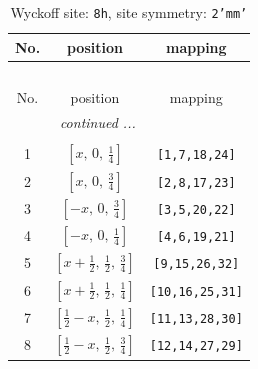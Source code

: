 \documentclass[fleqn,8pt]{jsarticle}
\begin{document}
\begin{longtable}{ccc}
\caption{Wyckoff site: {\tt 8h}, site symmetry: {\tt 2'mm'}}
 \\
 \hline \hline
No. & position & mapping \\ \hline \endfirsthead

\multicolumn{2}{l}{\tablename\ \thetable{}} \\
 \hline \hline
No. & position & mapping \\ \hline \endhead

 \hline \hline
\multicolumn{2}{r}{\footnotesize\it continued ...} \\ \endfoot

 \hline \hline
\multicolumn{2}{r}{} \\ \endlastfoot

1 & $\left[ x,\, 0,\, \frac{1}{4} \right]$ & {\tt [1,7,18,24]} \\ \hline
2 & $\left[ x,\, 0,\, \frac{3}{4} \right]$ & {\tt [2,8,17,23]} \\ \hline
3 & $\left[ - x,\, 0,\, \frac{3}{4} \right]$ & {\tt [3,5,20,22]} \\ \hline
4 & $\left[ - x,\, 0,\, \frac{1}{4} \right]$ & {\tt [4,6,19,21]} \\ \hline
5 & $\left[ x + \frac{1}{2},\, \frac{1}{2},\, \frac{3}{4} \right]$ & {\tt [9,15,26,32]} \\ \hline
6 & $\left[ x + \frac{1}{2},\, \frac{1}{2},\, \frac{1}{4} \right]$ & {\tt [10,16,25,31]} \\ \hline
7 & $\left[ \frac{1}{2} - x,\, \frac{1}{2},\, \frac{1}{4} \right]$ & {\tt [11,13,28,30]} \\ \hline
8 & $\left[ \frac{1}{2} - x,\, \frac{1}{2},\, \frac{3}{4} \right]$ & {\tt [12,14,27,29]} \\
\end{longtable}
\renewcommand{\arraystretch}{1.2}
\end{document}
